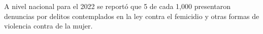 A nivel nacional para el 2022 se reportó que 5 de cada 1,000 presentaron denuncias por delitos contemplados en la ley contra el femicidio y otras formas de violencia contra de la mujer.